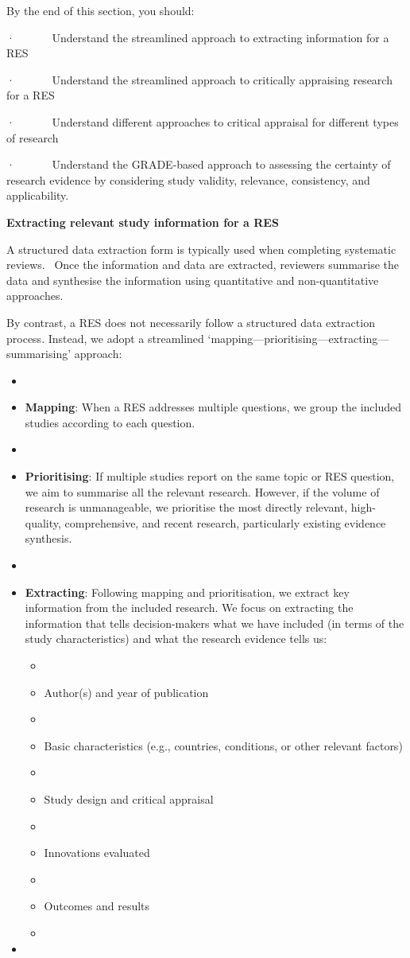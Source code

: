 \documentclass[
  letterpaper,
  DIV=11,
  numbers=noendperiod]{scrreprt}
\begin{document}
By the end of this section, you should:

·~~~~~~ Understand the streamlined approach to extracting information
for a RES

·~~~~~~ Understand the streamlined approach to critically appraising
research for a RES

·~~~~~~ Understand different approaches to critical appraisal for
different types of research

·~~~~~~ Understand the GRADE-based approach to assessing the certainty
of research evidence by considering study validity, relevance,
consistency, and applicability.

\textbf{Extracting relevant study information for a RES}

A structured data extraction form is typically used when completing
systematic reviews. ~Once the information and data are extracted,
reviewers summarise the data and synthesise the information using
quantitative and non-quantitative approaches.

By contrast, a RES does not necessarily follow a structured data
extraction process. Instead, we adopt a streamlined
`mapping---prioritising---extracting---summarising' approach:

\begin{itemize}
\item
\item
  \textbf{Mapping}: When a RES addresses multiple questions, we group
  the included studies according to each question.
\item
\item
  \textbf{Prioritising}: If multiple studies report on the same topic or
  RES question, we aim to summarise all the relevant research. However,
  if the volume of research is unmanageable, we prioritise the most
  directly relevant, high-quality, comprehensive, and recent research,
  particularly existing evidence synthesis.
\item
\item
  \textbf{Extracting}: Following mapping and prioritisation, we extract
  key information from the included research. We focus on extracting the
  information that tells decision-makers what we have included (in terms
  of the study characteristics) and what the research evidence tells us:

  \begin{itemize}
  \item
  \item
    Author(s) and year of publication
  \item
  \item
    Basic characteristics (e.g., countries, conditions, or other
    relevant factors)
  \item
  \item
    Study design and critical appraisal
  \item
  \item
    Innovations evaluated
  \item
  \item
    Outcomes and results
  \item
  \end{itemize}
\item
\end{itemize}
\end{document}

